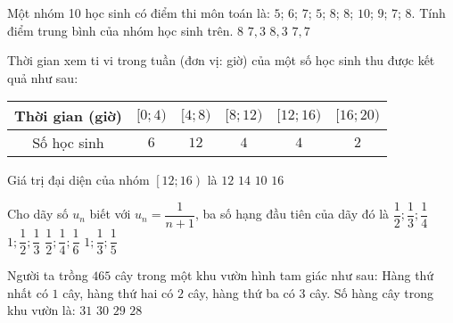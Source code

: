 \begin{ex}%
	Một nhóm 10 học sinh có điểm thi môn toán là: $5$; $6$; $7$; $5$; $8$; $8$; $10$; $9$; $7$; $8$. Tính điểm trung bình của nhóm học sinh trên.
	\choice
	{$8$}
	{\True $7{,}3$}
	{$8{,}3$}
	{$7{,}7$}
\end{ex}
\begin{ex}%
	Thời gian xem ti vi trong tuần (đơn vị: giờ) của một số học sinh thu được kết quả như sau:
	\begin{center}
	\begin{tabular}{|c|c|c|c|c|c|}
		\hline
		Thời gian (giờ)	& $[0;4)$ & $[4;8)$ & $[8;12)$ & $[12;16)$ & $[16;20)$ \\
		\hline
		Số học sinh	& $6$ & $12$ & $4$ & $4$ & $2$ \\
		\hline
	\end{tabular}
	\end{center}
	Giá trị đại diện của nhóm $\left[ 12;16 \right)$ là
	\choice
	{$12$}
	{\True $14$}
	{$10$}
	{$16$}
	\loigiai{
	Giá trị đại diện của nhóm $\left[ 12;16 \right)$ là $\dfrac{12+16}{2}=14$.
	}
\end{ex}
\begin{ex}%
	Cho dãy số $u_n$ biết với $u_n=\dfrac{1}{n+1}$, ba số hạng đầu tiên của dãy đó là
	\choice
	{\True $\dfrac{1}{2};\dfrac{1}{3};\dfrac{1}{4}$}
	{$1;\dfrac{1}{2};\dfrac{1}{3}$}
	{$\dfrac{1}{2};\dfrac{1}{4};\dfrac{1}{6}$}
	{$1;\dfrac{1}{3};\dfrac{1}{5}$}
\end{ex}
\begin{ex}%
	Người ta trồng $465$ cây trong một khu vườn hình tam giác như sau: Hàng thứ nhất có $1$ cây, hàng thứ hai có $2$ cây, hàng thứ ba có $3$ cây. Số hàng cây trong khu vườn là:
	\choice
	{$31$}
	{\True $30$}
	{$29$}
	{$28$}
\end{ex}
